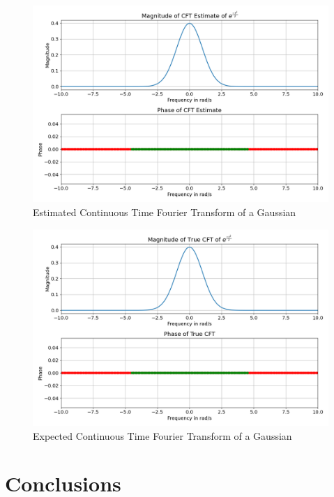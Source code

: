 \documentclass{article}
\begin{document}
\begin{figure}[!tbh]
\centering
\includegraphics[scale=0.4]{plots/CFT_Estimate.png}
\caption{Estimated Continuous Time Fourier Transform of a Gaussian}
\label{fig:8}
\end{figure}

\begin{figure}[!tbh]
\centering
\includegraphics[scale=0.4]{plots/True_CFT.png}
\caption{Expected Continuous Time Fourier Transform of a Gaussian}
\label{fig:9}
\end{figure}

\newpage
		
\section*{Conclusions}\label{conclusions}
\end{document}

